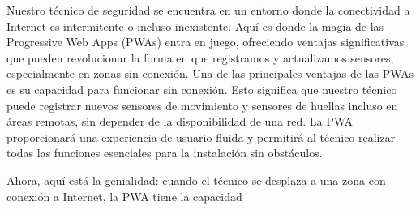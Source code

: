 \documentclass{article}
\begin{document}
Nuestro técnico de seguridad se encuentra en un entorno donde la conectividad a Internet es intermitente o incluso inexistente. Aquí es donde la magia de las Progressive Web Apps (PWAs) entra en juego, ofreciendo ventajas significativas que pueden revolucionar la forma en que registramos y actualizamos sensores, especialmente en zonas sin conexión. Una de las principales ventajas de las PWAs es su capacidad para funcionar sin conexión. Esto significa que nuestro técnico puede registrar nuevos sensores de movimiento y sensores de huellas incluso en áreas remotas, sin depender de la disponibilidad de una red. La PWA proporcionará una experiencia de usuario fluida y permitirá al técnico realizar todas las funciones esenciales para la instalación sin obstáculos.

Ahora, aquí está la genialidad: cuando el técnico se desplaza a una zona con conexión a Internet, la PWA tiene la capacidad
\end{document}
